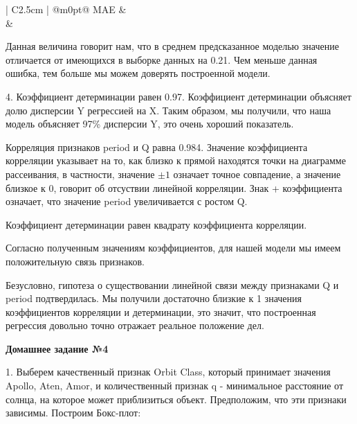 \documentclass{article}
\begin{document}
\begin{center}
  \begin{tabular}{| C{2.5cm} | @{}m{0pt}@{}}
    \hline
    MAE &\\[0.5em]  &\\[0.5em]   
    \hline
  \end{tabular}
\end{center}

Данная величина говорит нам, что в среднем предсказанное моделью значение отличается от имеющихся в выборке данных на 0.21. Чем меньше данная ошибка, тем больше мы можем доверять построенной модели.

4. Коэффициент детерминации равен 0.97. Коэффициент детерминации объясняет долю дисперсии Y регрессией на X. Таким образом, мы получили, что наша модель объясняет 97\% дисперсии Y, это очень хороший показатель.

Корреляция признаков period и Q равна 0.984. Значение коэффициента корреляции указывает на то, как близко к прямой  находятся точки на диаграмме рассеивания, в частности, значение $\pm 1$ означает точное совпадение, а значение близкое к 0, говорит об отсуствии линейной корреляции. Знак + коэффициента означает, что значение period увеличивается с ростом Q. 

Коэффициент детерминации равен квадрату коэффициента корреляции.

Согласно полученным значениям коэффициентов, для нашей модели мы имеем положительную связь признаков. 

Безусловно, гипотеза о существовании линейной связи между признаками Q и period подтвердилась. Мы получили достаточно близкие к 1 значения коэффициентов корреляции и детерминации, это значит, что построенная регрессия довольно точно отражает реальное положение дел. 

\vspace{.2cm}

\large \textbf{Домашнее задание №4}

1. Выберем качественный признак Orbit Class, который принимает значения Apollo, Aten, Amor, и количественный признак q - минимальное расстояние от солнца, на которое может приблизиться объект. Предположим, что эти признаки зависимы. Построим Бокс-плот:
\end{document}
